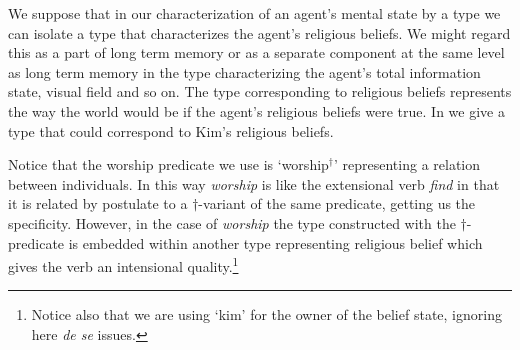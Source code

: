 We suppose that in our characterization of an agent's mental state by
a type we can isolate a type that characterizes the agent's religious
beliefs.  We might regard this as a part of long term memory or as a
separate component at the same level as long term memory in the type characterizing the
agent's total information state, visual field and
so on.  The type corresponding to religious beliefs represents the way
the world would be if the agent's religious beliefs were
true. In \nexteg{} we give
a type that could correspond to Kim's religious beliefs.
\begin{ex} 
\label{ex:KimrbeliefInst}
\end{ex} 
Notice that the worship predicate we use is `worship$^{\dagger}$'
representing a relation between individuals.  In this way
\textit{worship} is like the extensional verb \textit{find} in that it
is related by postulate to a $\dagger$-variant of the same predicate,
getting us the specificity.  However, in the case of \textit{worship}
the type constructed with the $\dagger$-predicate is embedded within
another type representing religious belief which gives the verb an
intensional quality.\footnote{Notice also that we are using `kim' for
  the owner of the belief state, ignoring here \textit{de se} issues.} 


